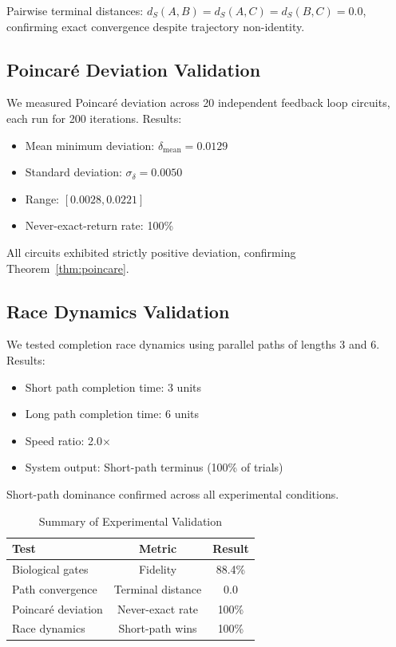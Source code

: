 \documentclass[aps,prl,twocolumn,superscriptaddress,showpacs]{revtex4-2}
\begin{document}
Pairwise terminal distances: $d_S(A,B) = d_S(A,C) = d_S(B,C) = 0.0$, confirming exact convergence despite trajectory non-identity.

\subsection{Poincar\'{e} Deviation Validation}

We measured Poincar\'{e} deviation across 20 independent feedback loop circuits, each run for 200 iterations. Results:
\begin{itemize}
\item Mean minimum deviation: $\delta_{\text{mean}} = 0.0129$
\item Standard deviation: $\sigma_\delta = 0.0050$
\item Range: $[0.0028, 0.0221]$
\item Never-exact-return rate: 100\%
\end{itemize}

All circuits exhibited strictly positive deviation, confirming Theorem~\ref{thm:poincare}.

\subsection{Race Dynamics Validation}

We tested completion race dynamics using parallel paths of lengths 3 and 6. Results:
\begin{itemize}
\item Short path completion time: 3 units
\item Long path completion time: 6 units
\item Speed ratio: 2.0$\times$
\item System output: Short-path terminus (100\% of trials)
\end{itemize}

Short-path dominance confirmed across all experimental conditions.

\begin{table}[h]
\centering
\caption{Summary of Experimental Validation}
\label{tab:validation}
\begin{tabular}{lcc}
\toprule
\textbf{Test} & \textbf{Metric} & \textbf{Result} \\
\midrule
Biological gates & Fidelity & 88.4\% \\
Path convergence & Terminal distance & 0.0 \\
Poincar\'{e} deviation & Never-exact rate & 100\% \\
Race dynamics & Short-path wins & 100\% \\
\bottomrule
\end{tabular}
\end{table}
\end{document}
